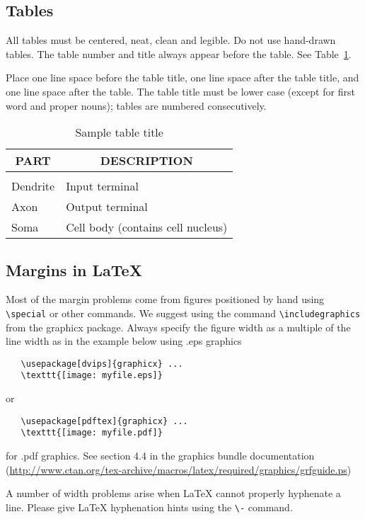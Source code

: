 \documentclass{article} %
\begin{document}
\subsection{Tables}

All tables must be centered, neat, clean and legible. Do not use hand-drawn
tables. The table number and title always appear before the table. See
Table~\ref{sample-table}.

Place one line space before the table title, one line space after the table
title, and one line space after the table. The table title must be lower case
(except for first word and proper nouns); tables are numbered consecutively.

\begin{table}[t]
\caption{Sample table title}
\label{sample-table}
\begin{center}
\begin{tabular}{ll}
\multicolumn{1}{c}{\bf PART}  &\multicolumn{1}{c}{\bf DESCRIPTION}
\\ \hline \\
Dendrite         &Input terminal \\
Axon             &Output terminal \\
Soma             &Cell body (contains cell nucleus) \\
\end{tabular}
\end{center}
\end{table}



\subsection{Margins in LaTeX}

Most of the margin problems come from figures positioned by hand using
\verb+\special+ or other commands. We suggest using the command
\verb+\includegraphics+
from the graphicx package. Always specify the figure width as a multiple of
the line width as in the example below using .eps graphics
\begin{verbatim}
   \usepackage[dvips]{graphicx} ...
   \texttt{[image: myfile.eps]}
\end{verbatim}
or %
\begin{verbatim}
   \usepackage[pdftex]{graphicx} ...
   \texttt{[image: myfile.pdf]}
\end{verbatim}
for .pdf graphics.
See section 4.4 in the graphics bundle documentation (\url{http://www.ctan.org/tex-archive/macros/latex/required/graphics/grfguide.ps})

A number of width problems arise when LaTeX cannot properly hyphenate a
line. Please give LaTeX hyphenation hints using the \verb+\-+ command.




\end{document}
